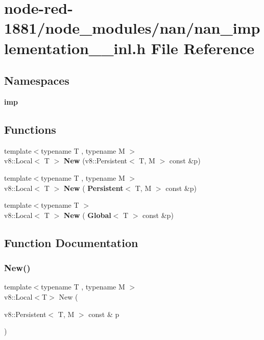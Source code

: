 \section{node-\/red-\/1881/node\+\_\+modules/nan/nan\+\_\+implementation\+\_\+\_\+inl.h File Reference}
\label{nan__implementation__12__inl_8h}
\subsection*{Namespaces}
\begin{DoxyCompactItemize}
\item 
 \textbf{ imp}
\end{DoxyCompactItemize}
\subsection*{Functions}
\begin{DoxyCompactItemize}
\item 
{\footnotesize template$<$typename T , typename M $>$ }\\v8\+::\+Local$<$ T $>$ \textbf{ New} (v8\+::\+Persistent$<$ T, M $>$ const \&p)
\item 
{\footnotesize template$<$typename T , typename M $>$ }\\v8\+::\+Local$<$ T $>$ \textbf{ New} (\textbf{ Persistent}$<$ T, M $>$ const \&p)
\item 
{\footnotesize template$<$typename T $>$ }\\v8\+::\+Local$<$ T $>$ \textbf{ New} (\textbf{ Global}$<$ T $>$ const \&p)
\end{DoxyCompactItemize}


\subsection{Function Documentation}
\mbox{\label{nan__implementation__12__inl_8h_aa8bb13d217b01e4eded944610930de42}} 
\subsubsection{New()\hspace{0.1cm}{\footnotesize\ttfamily [1/3]}}
{\footnotesize\ttfamily template$<$typename T , typename M $>$ \\
v8\+::\+Local$<$T$>$ New (\begin{DoxyParamCaption}\item[{v8\+::\+Persistent$<$ T, M $>$ const \&}]{p }\end{DoxyParamCaption})}



